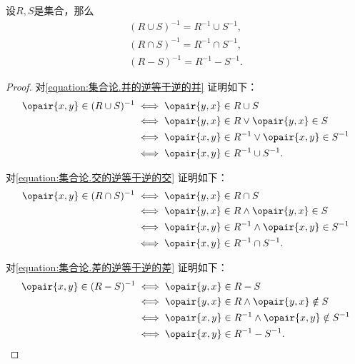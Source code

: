 \begin{theorem}
设\(R,S\)是集合，那么\begin{gather}
	(R \cup S)^{-1} = R^{-1} \cup S^{-1},
	\label{equation:集合论.并的逆等于逆的并} \\
	(R \cap S)^{-1} = R^{-1} \cap S^{-1},
	\label{equation:集合论.交的逆等于逆的交} \\
	(R - S)^{-1} = R^{-1} - S^{-1}.
	\label{equation:集合论.差的逆等于逆的差}
\end{gather}
\begin{proof}
对\cref{equation:集合论.并的逆等于逆的并} 证明如下：
\begin{align*}
	\opair{x,y} \in (R \cup S)^{-1}
	&\iff \opair{y,x} \in R \cup S \\
	&\iff \opair{y,x} \in R \lor \opair{y,x} \in S \\
	&\iff \opair{x,y} \in R^{-1} \lor \opair{x,y} \in S^{-1} \\
	&\iff \opair{x,y} \in R^{-1} \cup S^{-1}.
\end{align*}

对\cref{equation:集合论.交的逆等于逆的交} 证明如下：
\begin{align*}
	\opair{x,y} \in (R \cap S)^{-1}
	&\iff \opair{y,x} \in R \cap S \\
	&\iff \opair{y,x} \in R \land \opair{y,x} \in S \\
	&\iff \opair{x,y} \in R^{-1} \land \opair{x,y} \in S^{-1} \\
	&\iff \opair{x,y} \in R^{-1} \cap S^{-1}.
\end{align*}

对\cref{equation:集合论.差的逆等于逆的差} 证明如下：
\begin{align*}
	\opair{x,y} \in (R - S)^{-1}
	&\iff \opair{y,x} \in R - S \\
	&\iff \opair{y,x} \in R \land \opair{y,x} \notin S \\
	&\iff \opair{x,y} \in R^{-1} \land \opair{x,y} \notin S^{-1} \\
	&\iff \opair{x,y} \in R^{-1} - S^{-1}.
	\qedhere
\end{align*}
\end{proof}
\end{theorem}

